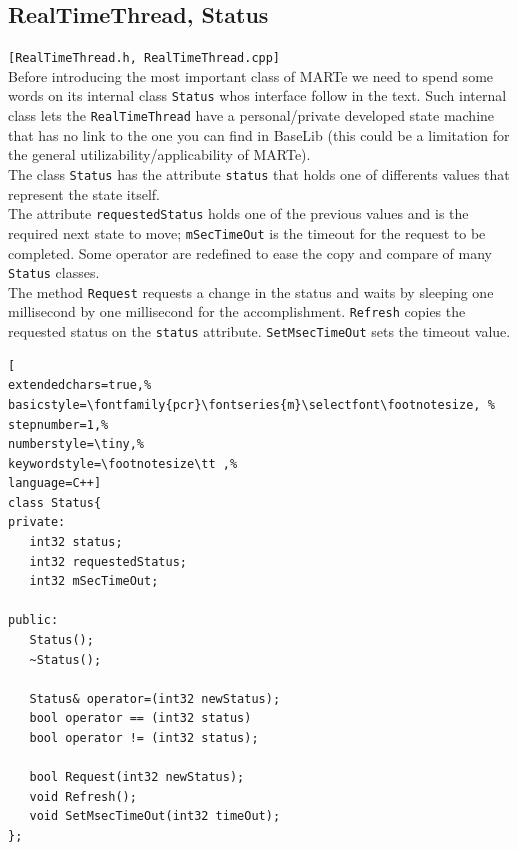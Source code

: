\subsection{RealTimeThread, Status}
\texttt{[RealTimeThread.h, RealTimeThread.cpp]} \\
Before introducing the most important class of MARTe we need to spend some words on its internal class \texttt{Status} whos interface follow in the text. Such internal class lets the \texttt{RealTimeThread} have a personal/private developed state machine that has no link to the one you can find in BaseLib (this could be a limitation for the general utilizability/applicability of MARTe). \\


The class \texttt{Status} has the attribute \texttt{status} that holds one of differents values  that represent the state itself. \\


The attribute \texttt{requestedStatus} holds one of the previous values and is the required next state to move; \texttt{mSecTimeOut} is the timeout for the request to be completed. Some operator are redefined to ease the copy and compare of many \texttt{Status} classes. \\


The method \texttt{Request} requests a change in the status and waits by sleeping one millisecond by one millisecond for the accomplishment. \texttt{Refresh} copies the requested status on the \texttt{status} attribute. \texttt{SetMsecTimeOut} sets the timeout value.

\begin{lstlisting}[
extendedchars=true,%
basicstyle=\fontfamily{pcr}\fontseries{m}\selectfont\footnotesize, %
stepnumber=1,%
numberstyle=\tiny,%
keywordstyle=\footnotesize\tt ,%
language=C++]
class Status{
private:
   int32 status;
   int32 requestedStatus;
   int32 mSecTimeOut;

public:
   Status();
   ~Status();

   Status& operator=(int32 newStatus);
   bool operator == (int32 status)
   bool operator != (int32 status);

   bool Request(int32 newStatus);
   void Refresh();
   void SetMsecTimeOut(int32 timeOut);
};
\end{lstlisting}




